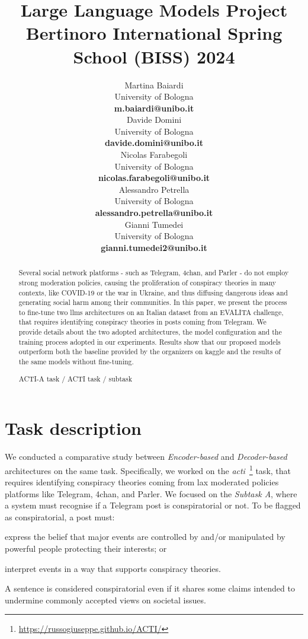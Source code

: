 \documentclass[11pt]{article}
\title{Large Language Models Project \\
Bertinoro International Spring School (BISS) 2024}
\author{
  Martina Baiardi \\
  University of Bologna \\
  {\bf m.baiardi@unibo.it} \\ \And
  Davide Domini \\
  University of Bologna \\
  {\bf davide.domini@unibo.it} \\  \And
  Nicolas Farabegoli \\
  University of Bologna \\
  {\bf nicolas.farabegoli@unibo.it} \\  \AND
  Alessandro Petrella\\
  University of Bologna \\
  {\bf alessandro.petrella@unibo.it} \\ \And
  Gianni Tumedei \\
  University of Bologna \\
  {\bf gianni.tumedei2@unibo.it}
}
\newcommand{\meta}[1]{{\color{blue}#1}}
\begin{document}
\maketitle

\begin{abstract}
Several social network platforms - such as Telegram, 4chan, and Parler - do not employ strong moderation
policies, causing the proliferation of conspiracy theories in many contexts, like COVID-19 or the war
in Ukraine, and thus diffusing dangerous ideas and generating social harm among their communities.
%
In this paper, we present the process to fine-tune two \acp{llm} architectures
on an Italian dataset from an EVALITA challenge, that requires identifying
conspiracy theories in posts coming from Telegram.
%
We provide details about the two adopted architectures, the model configuration and the training
process adopted in our experiments.
%
Results show that our proposed models outperform both the baseline provided by the organizers on kaggle and 
the results of the same models without fine-tuning.

\meta{ACTI-A task / ACTI task / subtask}
\end{abstract}

\section{Task description}\label{sec:task-description}
We conducted a comparative study between \emph{Encoder-based} and \emph{Decoder-based} architectures
on the same task.
%
Specifically, we worked on the \emph{\ac{acti}}~\footnote{\url{https://russogiuseppe.github.io/ACTI/}}
task, that requires identifying conspiracy theories coming from lax moderated policies platforms like
Telegram, 4chan, and Parler.
%
We focused on the \emph{Subtask A}, where a system must recognise if a Telegram post is conspiratorial
or not.
%
To be flagged as conspiratorial, a post must:
\begin{enumerate*}[label=(\roman{*})]
  \item express the belief that major events are controlled by and/or manipulated by powerful people protecting their interests; or
  \item interpret events in a way that supports conspiracy theories.
\end{enumerate*}
A sentence is considered conspiratorial even if it shares some claims intended to undermine commonly accepted views on societal issues.
\end{document}
